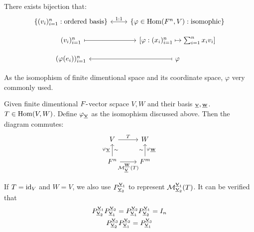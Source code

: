 \begin{proposition}
    There exists bijection that:
    \[
        \begin{tikzcd}[row sep=small]
            \{ (v_i)_{i=1}^n: \text{ordered basis} \} \arrow[leftrightarrow, r, "1:1"]
            & \{ \varphi \in \Hom(F^n, V): \text{isomophic} \} \\
            (v_i)_{i=1}^n  \arrow[mapsto, r]
            & \left[\varphi: (x_i)_{i=1}^n \mapsto \sum_{i=1}^n x_i v_i \right] \\
            (\varphi(e_i))_{i=1}^n
            & \varphi  \arrow[mapsto, l]
        \end{tikzcd}
    \]
\end{proposition}
As the isomophism of finite dimentional space and its coordinate space, $\varphi$ very commonly used.



\begin{proposition}
    Given finite dimentional $F\mbox{-}$vector scpace $V, W$ and their basis $\bs{V}{}, \bs{W}{}$. $T \in \operatorname{Hom}(V, W)$. Define $\varphi_{\bs{V}{}}$ as the isomophism discussed above. Then the diagram commutes:
    \[
        \begin{tikzcd}
            V \arrow[r, "T"]
            & W
            \\
            F^n \arrow[u, "\varphi_{\bs{V}{}}", "\sim"'] \arrow[r, "\calM^{\bs{W}{}}_{\bs{V}{}}(T)"']
            & F^m \arrow[u, "\varphi_{\bs{W}{}}"', "\sim"]
        \end{tikzcd}
    \]
\end{proposition}
If $T = \operatorname{id}_{V}$ and $W = V$, we also use $P^{\bs{V}{1}}_{\bs{V}{2}}$ to represent $\calM^{\bs{V}{1}}_{\bs{V}{2}}(T)$. It can be verified that 
\begin{gather*}
    P^{\bs{V}{1}}_{\bs{V}{2}} P^{\bs{V}{2}}_{\bs{V}{1}} = P^{\bs{V}{2}}_{\bs{V}{1}} P^{\bs{V}{1}}_{\bs{V}{2}} = I_n \\
    P^{\bs{V}{3}}_{\bs{V}{2}} P^{\bs{V}{2}}_{\bs{V}{1}} = P^{\bs{V}{3}}_{\bs{V}{1}}
\end{gather*}





